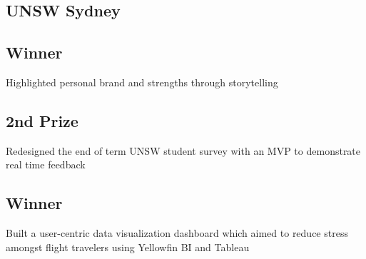 \documentclass[11pt, a4paper]{MagicalCV}
\begin{document}
\begin{minipage}[t]{0.38\textwidth}
\sectionsep
\subsection{UNSW Sydney}
\vspace{\topsep} %
\sectionsep

\sectionsep
\subsection{Winner}
Highlighted personal brand and strengths through storytelling
\sectionsep

\subsection{2nd Prize}
Redesigned the end of term UNSW student survey with an MVP to demonstrate real time feedback
\sectionsep

\subsection{Winner}
Built a user-centric data visualization dashboard which aimed to reduce stress amongst flight travelers using Yellowfin BI and Tableau
\sectionsep

\end{minipage} 
\hfill
\end{document}
